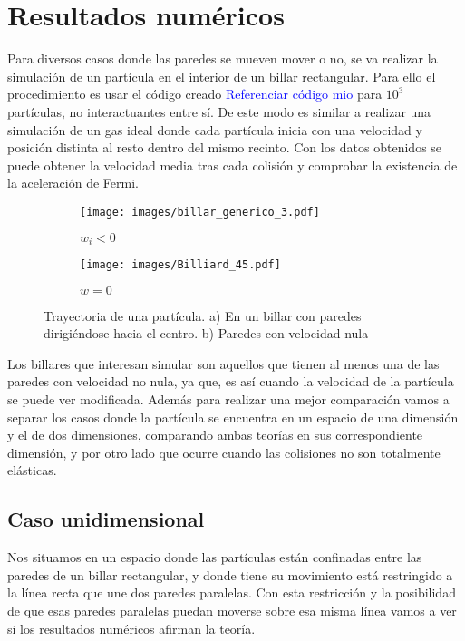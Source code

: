 %
%

\chapter{Resultados numéricos}

Para diversos casos donde las paredes se mueven mover o no, se va realizar la simulación de un partícula en el interior de un billar rectangular. Para ello el procedimiento es usar el código creado \cite{MiCodigo} \textcolor{blue}{Referenciar código mio} para \( 10^3 \) partículas, no interactuantes entre sí. De este modo es similar a realizar una simulación de un gas ideal donde cada partícula inicia con una velocidad y posición distinta al resto dentro del mismo recinto. Con los datos obtenidos se puede obtener la velocidad media tras cada colisión y comprobar la existencia de la aceleración de Fermi.

\begin{figure}[H]
    \begin{subfigure}[b]{0.5\textwidth}
        \centering
        \texttt{[image: images/billar\_generico\_3.pdf]}
        \caption{$w_i<0$}
        \label{fig:a}
    \end{subfigure}
    \hfill
    \begin{subfigure}[b]{0.5\textwidth}
        \centering
        \texttt{[image: images/Billiard\_45.pdf]}
        \caption{$w=0$}
        \label{fig:s}
    \end{subfigure}
    \caption{Trayectoria de una partícula. a) En un billar con paredes dirigiéndose hacia el centro. b) Paredes con velocidad nula}
\end{figure}


Los billares que interesan simular son aquellos que tienen al menos una de las paredes con velocidad no nula, ya que, es así cuando la velocidad de la partícula se puede ver modificada. Además para realizar una mejor comparación vamos a separar los casos donde la partícula se encuentra en un espacio de una dimensión y el de dos dimensiones, comparando ambas teorías en sus correspondiente dimensión, y por otro lado que ocurre cuando las colisiones no son totalmente elásticas.

\section{Caso unidimensional}

Nos situamos en un espacio donde las partículas están confinadas entre las paredes de un billar rectangular, y donde tiene su movimiento está restringido a la línea recta que une dos paredes paralelas. Con esta restricción y la posibilidad de que esas paredes paralelas puedan moverse sobre esa misma línea vamos a ver si los resultados numéricos afirman la teoría.

